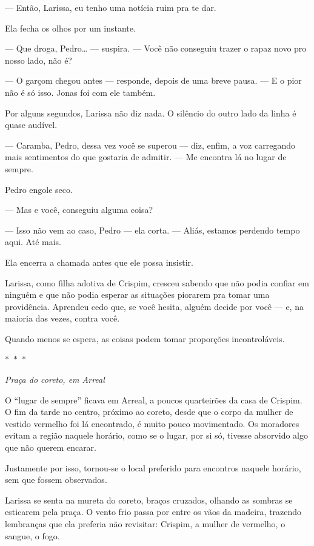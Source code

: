 — Então, Larissa, eu tenho uma notícia ruim pra te dar.

Ela fecha os olhos por um instante.

— Que droga, Pedro… — suspira. — Você não conseguiu trazer o rapaz novo pro nosso lado, não é?

— O garçom chegou antes — responde, depois de uma breve pausa. — E o pior não é só isso. Jonas foi com ele também.

Por alguns segundos, Larissa não diz nada.  
O silêncio do outro lado da linha é quase audível.

— Caramba, Pedro, dessa vez você se superou — diz, enfim, a voz carregando mais sentimentos do que gostaria de admitir. — Me encontra lá no lugar de sempre.

Pedro engole seco.

— Mas e você, conseguiu alguma coisa?

— Isso não vem ao caso, Pedro — ela corta. — Aliás, estamos perdendo tempo aqui. Até mais.

Ela encerra a chamada antes que ele possa insistir.

Larissa, como filha adotiva de Crispim, cresceu sabendo que não podia confiar em ninguém e que não podia esperar as situações piorarem pra tomar uma providência. Aprendeu cedo que, se você hesita, alguém decide por você — e, na maioria das vezes, contra você.

Quando menos se espera, as coisas podem tomar proporções incontroláveis.

\begin{center}
$\ast$~$\ast$~$\ast$

\textit{Praça do coreto, em Arreal}
\end{center}

O “lugar de sempre” ficava em Arreal, a poucos quarteirões da casa de Crispim. O fim da tarde no centro, próximo ao coreto, desde que o corpo da mulher de vestido vermelho foi lá encontrado, é muito pouco movimentado. Os moradores evitam a região naquele horário, como se o lugar, por si só, tivesse absorvido algo que não querem encarar.

Justamente por isso, tornou-se o local preferido para encontros naquele horário, sem que fossem observados.

Larissa se senta na mureta do coreto, braços cruzados, olhando as sombras se esticarem pela praça.  
O vento frio passa por entre os vãos da madeira, trazendo lembranças que ela preferia não revisitar: Crispim, a mulher de vermelho, o sangue, o fogo.

